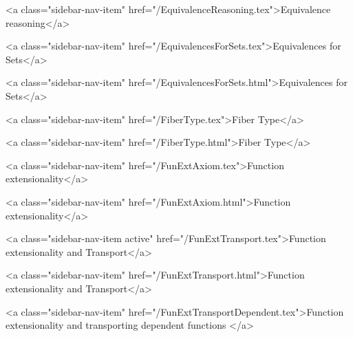       
        
          <a class="sidebar-nav-item" href="/EquivalenceReasoning.tex">Equivalence reasoning</a>
        
      
    
      
        
          <a class="sidebar-nav-item" href="/EquivalencesForSets.tex">Equivalences for Sets</a>
        
      
    
      
        
          <a class="sidebar-nav-item" href="/EquivalencesForSets.html">Equivalences for Sets</a>
        
      
    
      
        
          <a class="sidebar-nav-item" href="/FiberType.tex">Fiber Type</a>
        
      
    
      
        
          <a class="sidebar-nav-item" href="/FiberType.html">Fiber Type</a>
        
      
    
      
        
          <a class="sidebar-nav-item" href="/FunExtAxiom.tex">Function extensionality</a>
        
      
    
      
        
          <a class="sidebar-nav-item" href="/FunExtAxiom.html">Function extensionality</a>
        
      
    
      
        
          <a class="sidebar-nav-item active" href="/FunExtTransport.tex">Function extensionality and Transport</a>
        
      
    
      
        
          <a class="sidebar-nav-item" href="/FunExtTransport.html">Function extensionality and Transport</a>
        
      
    
      
        
          <a class="sidebar-nav-item" href="/FunExtTransportDependent.tex">Function extensionality and transporting dependent functions </a>
        
      
    
      
        
